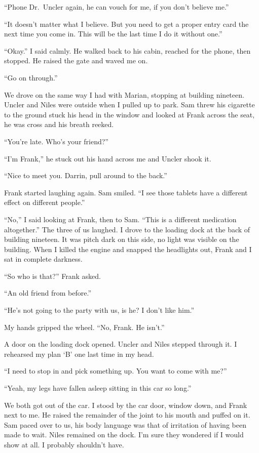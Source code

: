 \documentclass[
]{article}
\begin{document}
``Phone Dr.~Uncler again, he can vouch for me, if you don't believe
me.''

``It doesn't matter what I believe. But you need to get a proper entry
card the next time you come in. This will be the last time I do it
without one.''

``Okay.'' I said calmly. He walked back to his cabin, reached for the
phone, then stopped. He raised the gate and waved me on.

``Go on through.''

We drove on the same way I had with Marian, stopping at building
nineteen. Uncler and Niles were outside when I pulled up to park. Sam
threw his cigarette to the ground stuck his head in the window and
looked at Frank across the seat, he was cross and his breath reeked.

``You're late. Who's your friend?''

``I'm Frank,'' he stuck out his hand across me and Uncler shook it.

``Nice to meet you. Darrin, pull around to the back.''

Frank started laughing again. Sam smiled. ``I see those tablets have a
different effect on different people.''

``No,'' I said looking at Frank, then to Sam. ``This is a different
medication altogether.'' The three of us laughed. I drove to the loading
dock at the back of building nineteen. It was pitch dark on this side,
no light was visible on the building. When I killed the engine and
snapped the headlights out, Frank and I sat in complete darkness.

``So who is that?'' Frank asked.

``An old friend from before.''

``He's not going to the party with us, is he? I don't like him.''

My hands gripped the wheel. ``No, Frank. He isn't.''

A door on the loading dock opened. Uncler and Niles stepped through it.
I rehearsed my plan `B' one last time in my head.

``I need to stop in and pick something up. You want to come with me?''

``Yeah, my legs have fallen asleep sitting in this car so long.''

We both got out of the car. I stood by the car door, window down, and
Frank next to me. He raised the remainder of the joint to his mouth and
puffed on it. Sam paced over to us, his body language was that of
irritation of having been made to wait. Niles remained on the dock. I'm
sure they wondered if I would show at all. I probably shouldn't have.
\end{document}
